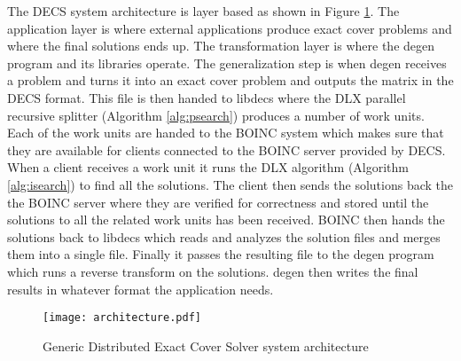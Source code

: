 The DECS system architecture is layer based as shown in Figure \ref{fig:architecture}.
The application layer is where external applications produce exact cover problems and where the final solutions ends up.
The transformation layer is where the degen program and its libraries operate.
The generalization step is when degen receives a problem and turns it into an exact cover problem and outputs the matrix in the DECS format.
This file is then handed to libdecs where the DLX parallel recursive splitter (Algorithm \ref{alg:psearch}) produces a number of work units.
Each of the work units are handed to the BOINC system which makes sure that they are available for clients connected to the BOINC server provided by DECS.
When a client receives a work unit it runs the DLX algorithm (Algorithm \ref{alg:isearch}) to find all the solutions.
The client then sends the solutions back the the BOINC server where they are verified for correctness and stored until the solutions to all the related work units has been received.
BOINC then hands the solutions back to libdecs which reads and analyzes the solution files and merges them into a single file.
Finally it passes the resulting file to the degen program which runs a reverse transform on the solutions.
degen then writes the final results in whatever format the application needs.

\begin{figure}[htbp]
	\centering 
	\texttt{[image: architecture.pdf]}
	\caption{Generic Distributed Exact Cover Solver system architecture}
	\label{fig:architecture}
\end{figure}








